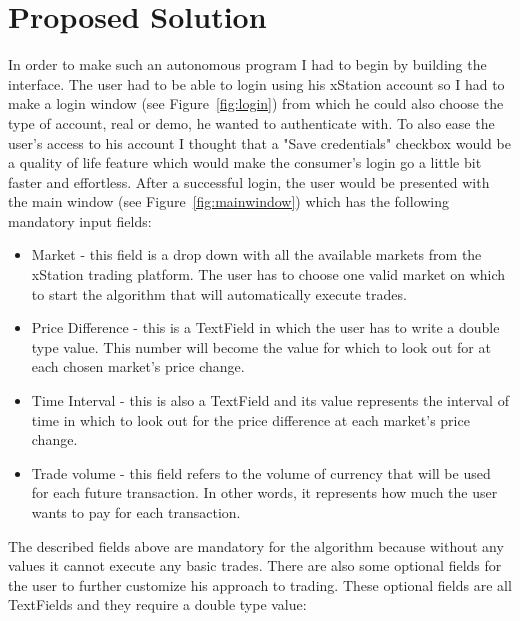 \documentclass[12pt,a4paper]{report}
\begin{document}
\chapter{Proposed Solution}
In order to make such an autonomous program I had to begin by building the interface. The user had to be able to login using his xStation account so I had to make a login window (see Figure~\ref{fig:login}) from which he could also choose the type of account, real or demo, he wanted to authenticate with. To also ease the user's access to his account I thought that a "Save credentials" checkbox would be a quality of life feature which would make the consumer's login go a little bit faster and effortless. After a successful login, the user would be presented with the main window (see Figure~\ref{fig:mainwindow}) which has the following mandatory input fields:
\begin{itemize}
	\item Market - this field is a drop down with all the available markets from the xStation trading platform. The user has to choose one valid market on which to start the algorithm that will automatically execute trades. 
	\item Price Difference - this is a TextField in which the user has to write a double type value. This number will become the value for which to look out for at each chosen market's price change.
	\item Time Interval - this is also a TextField and its value represents the interval of time in which to look out for the price difference at each market's price change.
	\item Trade volume - this field refers to the volume of currency that will be used for each future transaction. In other words, it represents how much the user wants to pay for each transaction.
\end{itemize}
The described fields above are mandatory for the algorithm because without any values it cannot execute any basic trades. There are also some optional fields for the user to further customize his approach to trading. These optional fields are all TextFields and they require a double type value:
\end{document}

